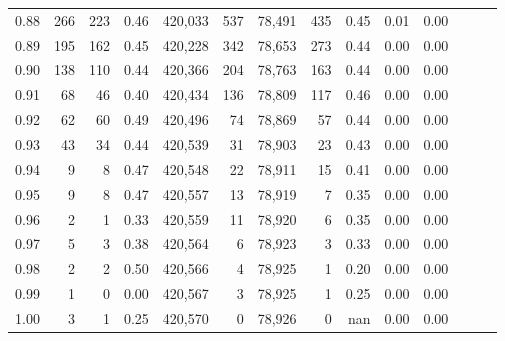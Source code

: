 \begin{tabular}{rrrrrrrrrrrrrr}
0.88 &     266 &    223 &  0.46 &  420,033 &      537 &  78,491 &     435 &  0.45 &  0.01 &      0.00 \\
0.89 &     195 &    162 &  0.45 &  420,228 &      342 &  78,653 &     273 &  0.44 &  0.00 &      0.00 \\
0.90 &     138 &    110 &  0.44 &  420,366 &      204 &  78,763 &     163 &  0.44 &  0.00 &      0.00 \\
0.91 &      68 &     46 &  0.40 &  420,434 &      136 &  78,809 &     117 &  0.46 &  0.00 &      0.00 \\
0.92 &      62 &     60 &  0.49 &  420,496 &       74 &  78,869 &      57 &  0.44 &  0.00 &      0.00 \\
0.93 &      43 &     34 &  0.44 &  420,539 &       31 &  78,903 &      23 &  0.43 &  0.00 &      0.00 \\
0.94 &       9 &      8 &  0.47 &  420,548 &       22 &  78,911 &      15 &  0.41 &  0.00 &      0.00 \\
0.95 &       9 &      8 &  0.47 &  420,557 &       13 &  78,919 &       7 &  0.35 &  0.00 &      0.00 \\
0.96 &       2 &      1 &  0.33 &  420,559 &       11 &  78,920 &       6 &  0.35 &  0.00 &      0.00 \\
0.97 &       5 &      3 &  0.38 &  420,564 &        6 &  78,923 &       3 &  0.33 &  0.00 &      0.00 \\
0.98 &       2 &      2 &  0.50 &  420,566 &        4 &  78,925 &       1 &  0.20 &  0.00 &      0.00 \\
0.99 &       1 &      0 &  0.00 &  420,567 &        3 &  78,925 &       1 &  0.25 &  0.00 &      0.00 \\
1.00 &       3 &      1 &  0.25 &  420,570 &        0 &  78,926 &       0 &   nan &  0.00 &      0.00 \\
\bottomrule
\end{tabular}
